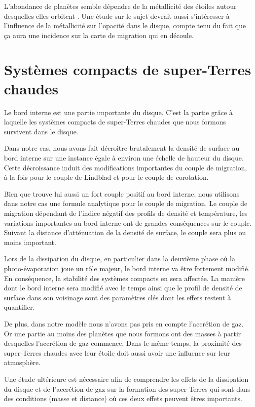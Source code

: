 L'abondance de planètes semble dépendre de la métallicité des étoiles autour desquelles elles orbitent \citep{fischer2005planet}. Une étude sur le sujet devrait aussi s'intéresser à l'influence de la métallicité sur l'opacité dans le disque, compte tenu du fait que ça aura une incidence sur la carte de migration qui en découle.

\section{Systèmes compacts de super-Terres chaudes}
Le bord interne est une partie importante du disque. C'est la partie grâce à laquelle les systèmes compacts de super-Terres chaudes que nous formons survivent dans le disque. 

Dans notre cas, nous avons fait décroitre brutalement la densité de surface au bord interne sur une instance égale à environ une échelle de hauteur du disque. Cette décroissance induit des modifications importantes du couple de migration, à la fois pour le couple de Lindblad et pour le couple de corotation. 

Bien que \cite{masset2006disk} trouve lui aussi un fort couple positif au bord interne, nous utilisons dans notre cas une formule analytique pour le couple de migration. Le couple de migration dépendant de l'indice négatif des profils de densité et température, les variations importantes au bord interne ont de grandes conséquences sur le couple. Suivant la distance d'atténuation de la densité de surface, le couple sera plus ou moins important. 

Lors de la dissipation du disque, en particulier dans la deuxième phase où la photo-évaporation joue un rôle majeur, le bord interne va être fortement modifié. En conséquence, la stabilité des systèmes compacts en sera affectée. La manière dont le bord interne sera modifié avec le temps ainsi que le profil de densité de surface dans son voisinage sont des paramètres clés dont les effets restent à quantifier. 

De plus, dans notre modèle nous n'avons pas pris en compte l'accrétion de gaz. Or une partie au moins des planètes que nous formons ont des masses à partir desquelles l'accrétion de gaz commence. Dans le même temps, la proximité des super-Terres chaudes avec leur étoile doit aussi avoir une influence sur leur atmosphère. 

Une étude ultérieure est nécessaire afin de comprendre les effets de la dissipation du disque et de l'accrétion de gaz sur la formation des super-Terres qui sont dans des conditions (masse et distance) où ces deux effets peuvent êtres importants.


